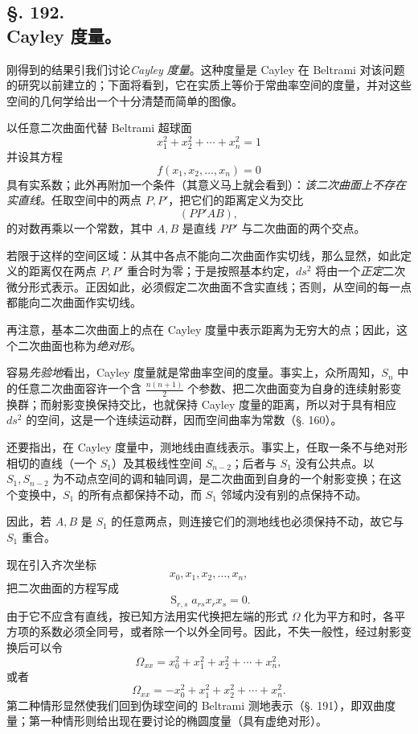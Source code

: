 \subsection*{§. 192.\\ Cayley 度量。}

刚得到的结果引我们讨论\emph{Cayley 度量}。这种度量是 Cayley 在 Beltrami 对该问题的研究以前建立的；下面将看到，它在实质上等价于常曲率空间的度量，并对这些空间的几何学给出一个十分清楚而简单的图像。

以任意二次曲面代替 Beltrami 超球面
\[
 x_1^2+x_2^2+\cdots+x_n^2=1
\]
并设其方程
\[
 f(x_1,x_2,\ldots,x_n)=0
\]
具有实系数；此外再附加一个条件（其意义马上就会看到）：\emph{该二次曲面上不存在实直线。}任取空间中的两点 $P,P'$，把它们的距离定义为交比
\[
 (PP'AB),
\]
的对数再乘以一个常数，其中 $A,B$ 是直线 $PP'$ 与二次曲面的两个交点。

若限于这样的空间区域：从其中各点不能向二次曲面作实切线，那么显然，如此定义的距离仅在两点 $P,P'$ 重合时为零；于是按照基本约定，$ds^2$ 将由一个\emph{正定}二次微分形式表示。正因如此，必须假定二次曲面不含实直线；否则，从空间的每一点都能向二次曲面作实切线。

再注意，基本二次曲面上的点在 Cayley 度量中表示距离为无穷大的点；因此，这个二次曲面也称为\emph{绝对形}。

容易\emph{先验地}看出，Cayley 度量就是常曲率空间的度量。事实上，众所周知，$S_n$ 中的任意二次曲面容许一个含 $\frac{n(n+1)}2$ 个参数、把二次曲面变为自身的连续射影变换群；而射影变换保持交比，也就保持 Cayley 度量的距离，所以对于具有相应 $ds^2$ 的空间，这是一个连续运动群，因而空间曲率为常数（§. 160）。

还要指出，在 Cayley 度量中，测地线由直线表示。事实上，任取一条不与绝对形相切的直线（一个 $S_1$）及其极线性空间 $S_{n-2}$；后者与 $S_1$ 没有公共点。以 $S_1,S_{n-2}$ 为不动点空间的调和轴同调，是二次曲面到自身的一个射影变换；在这个变换中，$S_1$ 的所有点都保持不动，而 $S_1$ 邻域内没有别的点保持不动。

因此，若 $A,B$ 是 $S_1$ 的任意两点，则连接它们的测地线也必须保持不动，故它与 $S_1$ 重合。

现在引入齐次坐标
\[
 x_0,x_1,x_2,\ldots,x_n,
\]
把二次曲面的方程写成
\[
 \mathop{\mathrm{S}}_{r,s} a_{rs}x_r x_s=0.
\]
由于它不应含有直线，按已知方法用实代换把左端的形式 $\Omega$ 化为平方和时，各平方项的系数必须全同号，或者除一个以外全同号。因此，不失一般性，经过射影变换后可以令
\[
 \Omega_{xx}=x_0^2+x_1^2+x_2^2+\cdots+x_n^2,
\]
或者
\[
 \Omega_{xx}=-x_0^2+x_1^2+x_2^2+\cdots+x_n^2.
\]
第二种情形显然使我们回到伪球空间的 Beltrami 测地表示（§. 191），即双曲度量；第一种情形则给出现在要讨论的椭圆度量（具有虚绝对形）。

